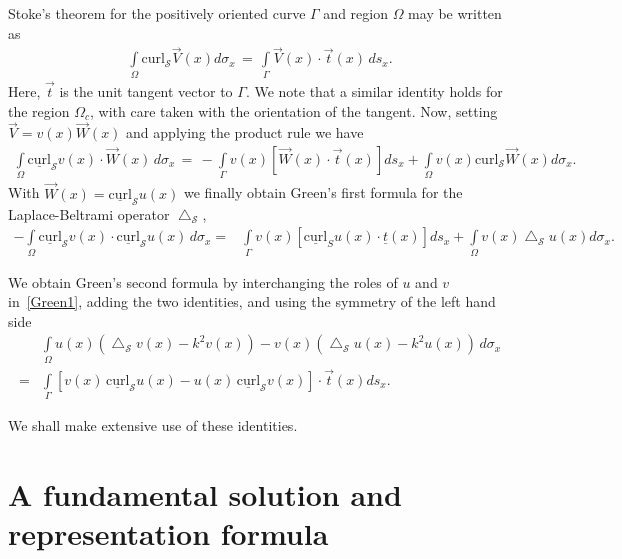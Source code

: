 \documentclass[final]{siamltex}
\newcommand{\lap}{\bigtriangleup}
\renewcommand{\S} {\mathcal{S}}
\begin{document}
Stoke's theorem for the  positively oriented curve $\Gamma$ and region
$\Omega$ may be written  as
\begin{align*}
\int\limits_{\Omega} \mbox{curl}_{\S} \vec{V}(x) d\sigma_x \, = \,
\int\limits_\Gamma \vec{V}(x) \cdot \vec{t}(x) \, ds_x .
\end{align*}
Here, $\vec{t}$ is the unit tangent vector to $\Gamma$. We note that a
similar identity holds for the region $\Omega_c$, with care taken with
the orientation of the tangent.  Now, setting $\vec{V} = v(x)
\vec{W}(x)$ and applying the product rule we have
\begin{align*}
\int\limits_{\Omega} \underline{\mbox{curl}}_{\S} v(x) \cdot
\vec{W}(x) \, d\sigma_x \, = \, 
-\int\limits_{\Gamma} v(x) [\vec{W}(x) \cdot \vec{t}(x)] ds_x +
\int\limits_{\Omega} v(x) \mbox{curl}_{\S} \vec{W}(x) d\sigma_x .
\end{align*}
With $\vec{W}(x) = \underline{\mbox{curl}}_{\S} u(x)$ we finally
obtain Green's first formula for the Laplace-Beltrami operator
$\lap_{\S}$,
\begin{align}
  \label{Green1}
  -\int\limits_{\Omega} \underline{\mbox{curl}}_{\S} v(x) \cdot
  \underline{\mbox{curl}}_{\S} u(x) \, d\sigma_x 
  =& \int\limits_{\Gamma} v(x) [\underline{\mbox{curl}}_S u(x) \cdot 
  \underline{t}(x)] ds_x +\int\limits_{\Omega} v(x) \lap_{\S}u(x) d\sigma_x.
\end{align}

We obtain Green's second formula by interchanging the roles of $u$ and
$v$ in~\eqref{Green1}, adding the two identities, and using the
symmetry of the left hand side
\begin{align}
&\displaystyle \int\limits_{\Omega} u(x)(\lap_{{\S}}v(x) -k^2 v(x))-
v(x)(\lap_{\S}u(x) -k^2u(x))\, d\sigma_x \nonumber \\
=&\int\limits_\Gamma [v(x)\,\underline{\mbox{curl}}_{\S} u(x) - u(x)\, \underline{\mbox{curl}}_{\S}v(x)]\cdot \vec{t}(x) ds_x. \label{Green2}
\end{align}


We shall make extensive use of these identities.





\section{A fundamental solution and representation formula}
\end{document}
